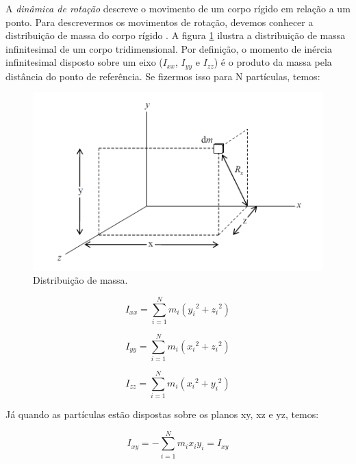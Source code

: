 A \textit{dinâmica de rotação} descreve o movimento de um corpo rígido em relação a um ponto. Para descrevermos os movimentos de rotação, devemos conhecer a distribuição de massa do corpo rígido \cite{Snider}. A figura \ref{fig:mass_snider_p16} ilustra a distribuição de massa infinitesimal de um corpo tridimensional. Por definição, o momento de inércia infinitesimal disposto sobre um eixo ($I_{xx}$, $I_{yy}$ e $I_{zz}$) é o produto da massa pela distância do ponto de referência. Se fizermos isso para N partículas, temos:

\begin{figure}[H]
  \caption{Distribuição de massa.}
  \begin{center}
      \includegraphics[scale=0.5]{referencial/img/mass_snider_p16}
  \end{center}
  \label{fig:mass_snider_p16}
\end{figure}

\begin{equation}
  I_{xx}=\sum_{i=1}^{N}{m_i({y_i}^{2}+{z_i}^{2})}
\end{equation}

\begin{equation}
  I_{yy}=\sum_{i=1}^{N}{m_i({x_i}^{2}+{z_i}^{2})}
\end{equation}

\begin{equation}
  I_{zz}=\sum_{i=1}^{N}{m_i({x_i}^{2}+{y_i}^{2})}
\end{equation}

Já quando as partículas estão dispostas sobre os planos xy, xz e yz, temos:

\begin{equation}
  I_{xy}=-\sum_{i=1}^{N}{m_ix_iy_i}=I_{xy}
\end{equation}

